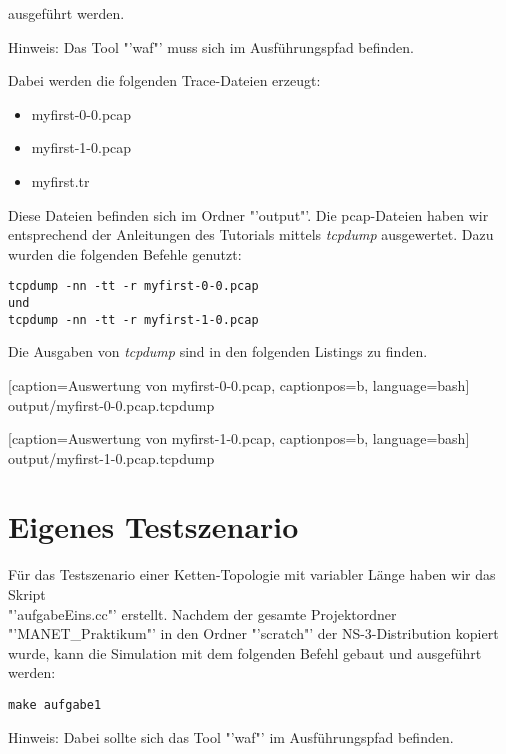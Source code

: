 \documentclass[12pt,a4paper,titlepage]{article}
\begin{document}
ausgeführt werden.
\begin{center}
Hinweis: Das Tool "'waf"' muss sich im Ausführungspfad befinden.
\end{center}

Dabei werden die folgenden Trace-Dateien erzeugt:

\begin{itemize}
\item myfirst-0-0.pcap
\item myfirst-1-0.pcap
\item myfirst.tr
\end{itemize}

Diese Dateien befinden sich im Ordner "'output"'. Die pcap-Dateien haben wir entsprechend der Anleitungen des Tutorials mittels \textit{tcpdump} ausgewertet. Dazu wurden die folgenden Befehle genutzt:

\begin{lstlisting}
tcpdump -nn -tt -r myfirst-0-0.pcap
und
tcpdump -nn -tt -r myfirst-1-0.pcap
\end{lstlisting}

Die Ausgaben von \textit{tcpdump} sind in den folgenden Listings zu finden.


	[caption={Auswertung von myfirst-0-0.pcap}\label{lst:myfirst_1_pcap},
		captionpos=b,
		language=bash] %
	{output/myfirst-0-0.pcap.tcpdump}


	[caption={Auswertung von myfirst-1-0.pcap}\label{lst:myfirst_2_pcap},
		captionpos=b,
		language=bash] %
	{output/myfirst-1-0.pcap.tcpdump}

\section{Eigenes Testszenario}

Für das Testszenario einer Ketten-Topologie mit variabler Länge haben wir das Skript\\ "'aufgabeEins.cc"' erstellt. Nachdem der gesamte Projektordner "'MANET\_Praktikum"' in den Ordner "'scratch"' der NS-3-Distribution kopiert wurde, kann die Simulation mit dem folgenden Befehl gebaut und ausgeführt werden:

\begin{lstlisting}
make aufgabe1
\end{lstlisting}

\begin{center}
Hinweis: Dabei sollte sich das Tool "'waf"' im Ausführungspfad befinden.
\end{center}
\end{document}

